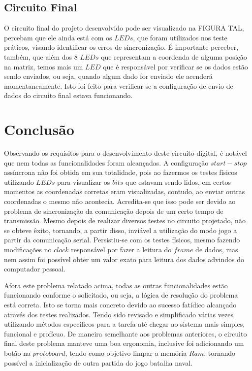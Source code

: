 \documentclass[12pt]{article}
\begin{document}
\subsection{Circuito Final}
O circuito final do projeto desenvolvido pode ser visualizado  na FIGURA TAL, percebam que ele ainda está com os $LEDs$, que foram utilizados nos teste práticos, visando identificar os erros de sincronização. É importante perceber, também, que além dos 8 $LEDs$ que representam a coordenda de alguma posição na matriz, temos mais um $LED$ que é responsável por verificar se os dados estão sendo enviados, ou seja, quando algum dado for enviado ele acenderá momentaneamente. Isto foi feito para verificar se a configuração de envio de dados do circuito final estava funcionando.

\section{Conclusão}

Observando os requisitos para o desenvolvimento deste circuito digital, é notável que nem todas as funcionalidades foram alcançadas. A configuração $start-stop$ assíncrona não foi obtida em sua totalidade, pois ao fazermos os testes físicos utilizando $LEDs$ para visualizar os $bits$ que estavam sendo lidos, em certos momentos as coordenadas corretas eram visualizadas, contudo, ao enviar outras coordenadas o mesmo não acontecia. Acredita-se que isso pode ser devido ao problema de sincronização da comunicação depois de um certo tempo de transmissão. Mesmo depois de realizar diversos testes no circuito projetado, não se obteve êxito, tornando, a partir disso, inviável a utilização do modo jogo a partir da comunicação serial. Persistiu-se com os testes físicos, mesmo fazendo modificações no $clock$ responsável por fazer a leitura do $frame$ de dados, mas nem assim foi possível obter um valor exato para leitura dos dados advindos do computador pessoal.


Afora este problema relatado acima, todas as outras funcionalidades estão funcionando conforme o solicitado, ou seja, a lógica de resolução do problema está correta. Isto se torna mais concreto devido ao sucesso fatídico alcançado através dos testes realizados. Tendo sido revisado e simplificado várias vezes utilizando métodos específicos para a tarefa até chegar ao sistema mais simples, funcional e profícuo. De maneira semelhante aos problemas anteriores, o circuito final deste problema manteve uma boa ergonomia, inclusive foi adicionando um botão na $protoboard$, tendo como objetivo limpar a memória $Ram$, tornando possível a inicialização de outra partida do jogo batalha naval. 
\end{document}
